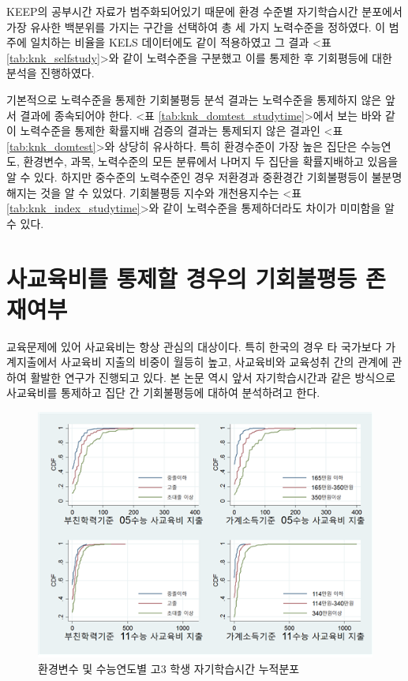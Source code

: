 KEEP의 공부시간 자료가 범주화되어있기 때문에 환경 수준별 자기학습시간 분포에서 가장 유사한 백분위를 가지는 구간을 선택하여 총 세 가지 노력수준을 정하였다.
이 범주에 일치하는 비율을 KELS 데이터에도 같이 적용하였고 그 결과 <표 \ref{tab:knk_selfstudy}>와 같이 노력수준을 구분했고 이를 통제한 후 기회평등에 대한 분석을 진행하였다.


기본적으로 노력수준을 통제한 기회불평등 분석 결과는 노력수준을 통제하지 않은 앞서 결과에 종속되어야 한다.
<표 \ref{tab:knk_domtest_studytime}>에서 보는 바와 같이 노력수준을 통제한 확률지배 검증의 결과는 통제되지 않은 결과인 <표 \ref{tab:knk_domtest}>와 상당히 유사하다.
 특히 환경수준이 가장 높은 집단은 수능연도, 환경변수, 과목, 노력수준의 모든 분류에서 나머지 두 집단을 확률지배하고 있음을 알 수 있다.
 하지만 중수준의 노력수준인 경우 저환경과 중환경간 기회불평등이 불분명해지는 것을 알 수 있었다.
 기회불평등 지수와 개천용지수는 <표 \ref{tab:knk_index_studytime}>와 같이 노력수준을 통제하더라도 차이가 미미함을 알 수 있다.



\section{사교육비를 통제할 경우의 기회불평등 존재여부}

교육문제에 있어 사교육비는 항상 관심의 대상이다.
특히 한국의 경우 타 국가보다 가계지출에서 사교육비 지출의 비중이 월등히 높고, 사교육비와 교육성취 간의 관계에 관하여 활발한 연구가 진행되고 있다.
본 논문 역시 앞서 자기학습시간과 같은 방식으로 사교육비를 통제하고 집단 간 기회불평등에 대하여 분석하려고 한다.

\begin{figure}
    \centering
    \includegraphics[width=140mm]{figure/knk_cdf_tutor.png}
    \caption{환경변수 및 수능연도별 고3 학생 자기학습시간 누적분포}
    \label{fig:knk_cdf_tutor}
\end{figure}

